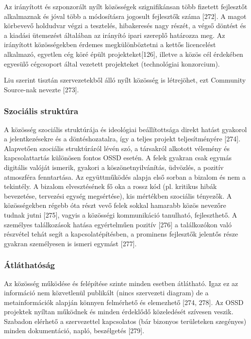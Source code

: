 \documentclass[12pt,magyar,a4paper,oneside]{scrreprt}
\begin{document}
Az irányított és szponzorált nyílt közösségek szignifikánsan több
fizetett fejlesztőt alkalmaznak és jóval több a módosításra jogosult
fejlesztők száma {[}272{]}. A magot körbevevő holdudvar végzi a
tesztelés, hibakeresés nagy részét, a végső döntést és a kiadási
ütemezést általában az irányító ipari szereplő határozza meg. Az
irányított közösségekben érdemes megkülönböztetni a kettős licencelést
alkalmazó, egyetlen cég köré épült projekteket{[}126{]}, illetve a közös
cél érdekében egyesülő cégcsoport által vezetett projekteket
(technológiai konzorcium).

Liu szerint tisztán szervezetekből álló nyílt közösség is létrejöhet,
ezt Community Source-nak nevezte {[}273{]}.

\hypertarget{szociuxe1lis-struktuxfara}{%
\subsubsection{Szociális struktúra}\label{szociuxe1lis-struktuxfara}}

A közösség szociális struktúrája és ideológiai beállítottsága direkt
hatást gyakorol a jelentkezésekre és a döntéshozatalra, így a teljes
projekt teljesítményére {[}274{]}. Alapvetően szociális struktúráról
lévén szó, a társakról alkotott vélemény és kapcsolattartás különösen
fontos OSSD esetén. A felek gyakran csak egymás digitális valóját
ismerik, gyakori a köszönetnyilvánítás, üdvözlés, a pozitív atmoszféra
fenntartása. Az együttműködés alapja első sorban a bizalom és nem a
tekintély. A bizalom elvesztésének fő oka a rossz kód (pl. kritikus
hibák bevezetése, tervezési egység megsértése), kis mértékben szociális
tényezők. A közösségekben régebb óta részt vevő felek sokkal hamarabb
közös nevezőre tudnak jutni {[}275{]}, vagyis a közösségi kommunikáció
tanulható, fejleszthető. A személyes találkozások hatása egyértelműen
pozitív {[}276{]} a találkozókon való részvétel tehát segít a
kapcsolatépítésben, a prominens fejlesztők jelentős része gyakran
személyesen is ismeri egymást {[}277{]}.

\hypertarget{uxe1tluxe1thatuxf3suxe1g}{%
\subsubsection{Átláthatóság}\label{uxe1tluxe1thatuxf3suxe1g}}

Az közösség működése és felépítése szinte minden esetben átlátható. Igaz
ez az információ nem közvetlenül publikált (nincs szervezeti diagram) de
a metainformációk alapján könnyen felmérhető és elemezhető {[}274,
278{]}. Az OSSD projektek nyíltan működnek és minden érdeklődő
közeledését szívesen veszik. Szabadon elérhető a szervezettel
kapcsolatos (bár bizonyos területeken szegényes) minden dokumentáció,
napló, beszélgetés {[}279{]}.
\end{document}
